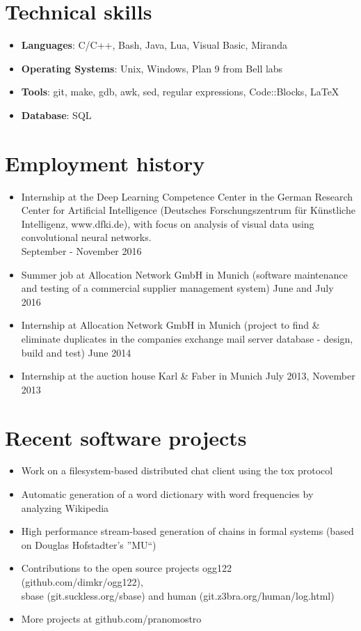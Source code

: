\documentclass[11pt,a4paper]{article}
\begin{document}
\section*{Technical skills}
\begin{itemize}
	\setlength{\itemsep}{1pt}
	\item[]{\bf Languages}: C/C++, Bash, Java, Lua, Visual Basic, Miranda
	\item[]{\bf Operating Systems}: Unix, Windows, Plan 9 from Bell labs
	\item[]{\bf Tools}: git, make, gdb, awk, sed, regular expressions, Code::Blocks, LaTeX
	\item[]{\bf Database}: SQL
\end{itemize}

\section*{Employment history}
\begin{itemize}
	\setlength{\itemsep}{1pt}
	\item Internship at the Deep Learning Competence Center in the German Research Center for Artificial Intelligence
	(Deutsches Forschungszentrum für Künstliche Intelligenz, www.dfki.de), with focus on analysis of
	visual data using convolutional neural networks.\\
	\hfill September - November 2016
	\item Summer job at Allocation Network GmbH in Munich (software maintenance and testing of a commercial supplier management system)
	\hfill June and July 2016
	\item Internship at Allocation Network GmbH in Munich (project to find
	\& eliminate duplicates in the companies exchange mail
	server database - design, build and test)
	\hfill June 2014
	\item Internship at the auction house Karl \& Faber in Munich \hfill July 2013, November 2013
\end{itemize}

\section*{Recent software projects}
\begin{itemize}
	\setlength{\itemsep}{1pt}
	\item Work on a filesystem-based distributed chat client using the tox protocol
	\item Automatic generation of a word dictionary with word
	frequencies by analyzing Wikipedia
	\item High performance stream-based generation of chains
	in formal systems (based on Douglas Hofstadter's ''MU``)
	\item Contributions to the open source projects ogg122 (github.com/dimkr/ogg122),\\
	sbase (git.suckless.org/sbase) and human (git.z3bra.org/human/log.html)
	\item More projects at github.com/pranomostro
\end{itemize}
\end{document}
